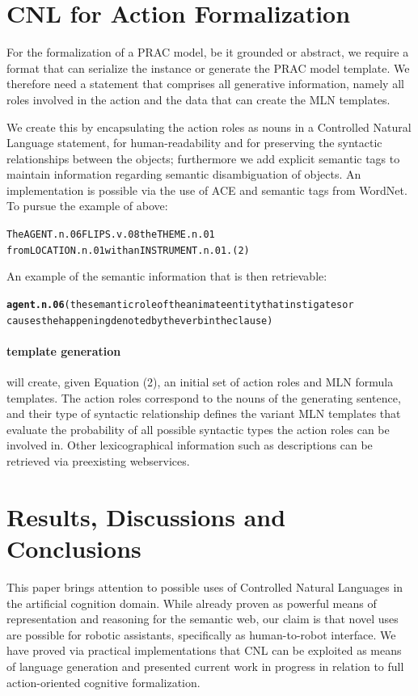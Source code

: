 \documentclass[oribibl]{llncs}
\begin{document}
\section{CNL for Action Formalization}
For the formalization of a PRAC model, be it grounded or abstract, we 
require a format that can serialize the instance or generate the PRAC 
model template.
We therefore need a statement that comprises all generative information,
 namely all roles involved in the action and the data that can create 
 the MLN templates.  

We create this by encapsulating the action roles as nouns in a Controlled 
Natural Language statement, for human-readability and for preserving the 
syntactic relationships between the objects; furthermore we add explicit 
semantic tags to maintain information regarding semantic disambiguation
 of objects.
An implementation is possible via the use of ACE and semantic tags from 
WordNet\cite{Miller95wordnet:a}. To pursue the example of above:
\begin{alltt}
The AGENT.n.06 FLIPS.v.08 the THEME.n.01 
from LOCATION.n.01 with an INSTRUMENT.n.01. \hfill {\normalfont (2)}
\end{alltt}
An example of the semantic information that is then retrievable:
{\small
\begin{alltt}
\textbf{agent.n.06} {\color{red}(the semantic role of the animate entity that instigates or 
causes the happening denoted by the verb in the clause)}
\end{alltt}}

\paragraph{template generation} will create, given Equation (2), 
an initial set of action roles and MLN formula templates.  
The action roles correspond to the nouns of the generating sentence, 
and their type of syntactic relationship defines the variant MLN 
templates that evaluate the probability of all possible syntactic 
types the action roles can be involved in. Other lexicographical 
information such as descriptions can be retrieved via preexisting 
webservices.

\section{Results, Discussions and Conclusions}
This paper brings attention to possible uses of Controlled Natural 
Languages in the artificial cognition domain. While already proven 
as powerful means of representation and reasoning for the semantic 
web\cite{kaljurand:phd}, our claim is that novel uses are possible 
for robotic assistants, specifically as human-to-robot interface.
We have proved via practical implementations that CNL can be exploited
 as means of language generation and presented current work in progress
  in relation to full action-oriented cognitive formalization.
\end{document}
